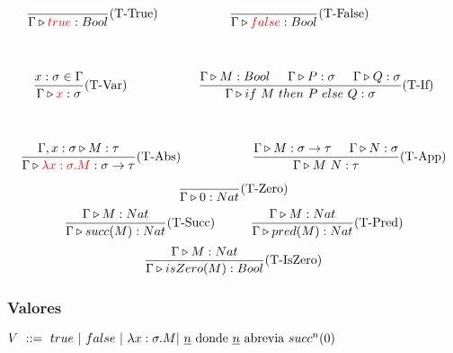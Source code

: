 \documentclass[10pt,a4paper]{article}
\begin{document}
\begin{equation*}
\begin{gathered}
    \frac{}{\judgeType{\Gamma}{\lambdaValue{true}}{Bool}}(\text{T-True}) \hspace*{2cm} \frac{}{\judgeType{\Gamma}{\lambdaValue{false}}{Bool}}(\text{T-False})\hspace*{2cm} \\
    \vspace*{5mm} \\
    \frac{x:\sigma\in\Gamma}{\judgeType{\Gamma}{\lambdaValue{x}}{\sigma}}(\text{T-Var})\hspace*{2cm}
    \frac{\judgeType{\Gamma}{M}{Bool}\hspace*{5mm}\judgeType{\Gamma}{P}{\sigma}\hspace*{5mm}\judgeType{\Gamma}{Q}{\sigma}}{\judgeType{\Gamma}{\lambdaIf{M}{P}{Q}}{\sigma}}(\text{T-If}) \\
    \vspace*{5mm} \\
    \frac {\judgeType{\Gamma,x:\sigma}{M}{\tau}}
          {\judgeType{\Gamma}{\lambdaValue{\lambdaAbs{x}{\sigma}{M}}}{\sigma\to\tau}}(\text{T-Abs})\hspace*{2cm}
    \frac{\judgeType{\Gamma}{M}{\sigma\to\tau}\hspace*{5mm}\judgeType{\Gamma}{N}{\sigma}}{\judgeType{\Gamma}{\lambdaApp{M}{N}}{\tau}}(\text{T-App})
\end{gathered}
\end{equation*}

\vspace*{5mm}
\begin{equation*}
\frac{}{\Gamma\triangleright 0 : Nat}(\text{T-Zero})
\end{equation*}
\vspace*{5mm}
\begin{equation*}
\frac{\Gamma\triangleright M : Nat}
{\Gamma\triangleright succ(M) : Nat}(\text{T-Succ})\hspace*{1cm}
\frac{\Gamma\triangleright M : Nat}{\Gamma\triangleright pred(M) : Nat}(\text{T-Pred})
\end{equation*}
\vspace*{5mm}
\begin{equation*}
\frac{\Gamma\triangleright M : Nat}{\Gamma\triangleright isZero(M) : Bool}(\text{T-IsZero})
\end{equation*}


\subsubsection*{Valores}
$ V~::=~true~|~false~|~\lambda x: \sigma . M|~\underline{n}\text{ donde } \underline{n} \text{ abrevia } succ^n(0)$
\end{document}

